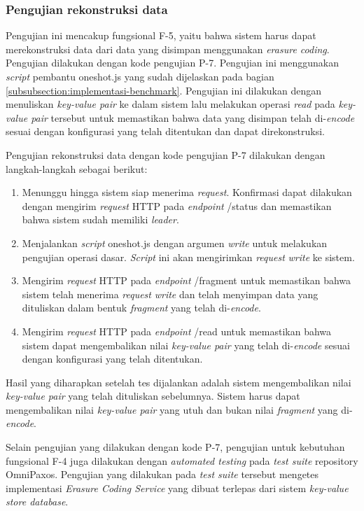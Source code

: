 \subsubsection{Pengujian rekonstruksi data}
\label{subsubsection:pengujian-rekonstruksi-data}

Pengujian ini mencakup fungsional F-5, yaitu bahwa sistem harus dapat merekonstruksi data dari data yang disimpan menggunakan \textit{erasure coding}. Pengujian dilakukan dengan kode pengujian P-7. Pengujian ini menggunakan \textit{script} pembantu oneshot.js yang sudah dijelaskan pada bagian \ref{subsubsection:implementasi-benchmark}. Pengujian ini dilakukan dengan menuliskan \textit{key-value pair} ke dalam sistem lalu melakukan operasi \textit{read} pada \textit{key-value pair} tersebut untuk memastikan bahwa data yang disimpan telah di-\textit{encode} sesuai dengan konfigurasi yang telah ditentukan dan dapat direkonstruksi.

Pengujian rekonstruksi data dengan kode pengujian P-7 dilakukan dengan langkah-langkah sebagai berikut:
\begin{enumerate}
  \item Menunggu hingga sistem siap menerima \textit{request}. Konfirmasi dapat dilakukan dengan mengirim \textit{request} HTTP pada \textit{endpoint} /status dan memastikan bahwa sistem sudah memiliki \textit{leader}.
  \item Menjalankan \textit{script} oneshot.js dengan argumen \textit{write} untuk melakukan pengujian operasi dasar. \textit{Script} ini akan mengirimkan \textit{request} \textit{write} ke sistem.
  \item Mengirim \textit{request} HTTP pada \textit{endpoint} /fragment untuk memastikan bahwa sistem telah menerima \textit{request} \textit{write} dan telah menyimpan data yang dituliskan dalam bentuk \textit{fragment} yang telah di-\textit{encode}.
  \item Mengirim \textit{request} HTTP pada \textit{endpoint} /read untuk memastikan bahwa sistem dapat mengembalikan nilai \textit{key-value pair} yang telah di-\textit{encode} sesuai dengan konfigurasi yang telah ditentukan.
\end{enumerate}

Hasil yang diharapkan setelah tes dijalankan adalah sistem mengembalikan nilai \textit{key-value pair} yang telah dituliskan sebelumnya. Sistem harus dapat mengembalikan nilai \textit{key-value pair} yang utuh dan bukan nilai \textit{fragment} yang di-\textit{encode}.

Selain pengujian yang dilakukan dengan kode P-7, pengujian untuk kebutuhan fungsional F-4 juga dilakukan dengan \textit{automated testing} pada \textit{test suite} repository OmniPaxos. Pengujian yang dilakukan pada \textit{test suite} tersebut mengetes implementasi \textit{Erasure Coding Service} yang dibuat terlepas dari sistem \textit{key-value store database}.